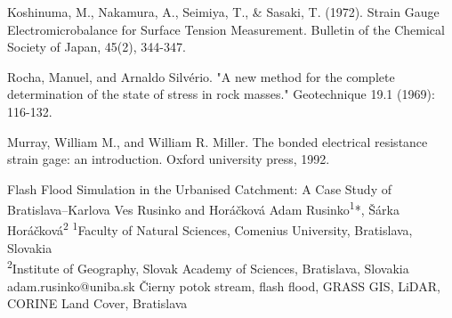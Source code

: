 {Koshinuma, M., Nakamura, A., Seimiya, T., \& Sasaki, T. (1972). Strain Gauge Electromicrobalance for Surface Tension Measurement. Bulletin of the Chemical Society of Japan, 45(2), 344-347.
	
Rocha, Manuel, and Arnaldo Silvério. "A new method for the complete determination of the state of stress in rock masses." Geotechnique 19.1 (1969): 116-132.

Murray, William M., and William R. Miller. The bonded electrical resistance strain gage: an introduction. Oxford university press, 1992.
}

\abstract
{Flash Flood Simulation in the Urbanised Catchment: A Case Study of Bratislava–Karlova Ves} %
{Rusinko and Horáčková} %
{Adam Rusinko\textsuperscript{1}*, Šárka Horáčková\textsuperscript{2}} %
{\POtag} %
{
	\textsuperscript{1}Faculty of Natural Sciences, Comenius University, Bratislava, Slovakia\\
	\textsuperscript{2}Institute of Geography, Slovak Academy of Sciences, Bratislava, Slovakia
} %
{adam.rusinko@uniba.sk}  %
{Čierny potok stream, flash flood, GRASS GIS, LiDAR, CORINE Land Cover, Bratislava}%
